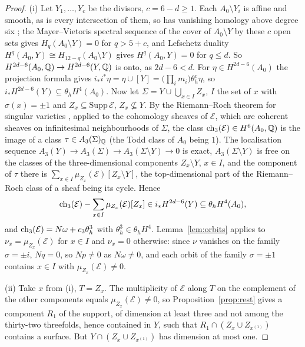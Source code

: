 \begin{proof}
(i) Let $Y_{1},\dots,Y_{c}$ be the divisors, $c=6-d\ge1$. Each $A_{0}\setminus Y_{i}$ is affine and smooth, as is every intersection of them, so has vanishing homology above degree six \cite{AF59}; the Mayer--Vietoris spectral sequence of the cover of $A_{0}\setminus Y$ by these $c$ open sets gives $H_{q}(A_{0}\setminus Y)=0$ for $q>5+c$, and Lefschetz duality $H^{q}(A_{0},Y)\cong H_{12-q}(A_{0}\setminus Y)$ gives $H^{q}(A_{0},Y)=0$ for $q\le d$. So $H^{2d-6}(A_{0},\mathbb{Q})\to H^{2d-6}(Y,\mathbb{Q})$ is onto, as $2d-6<d$. For $\eta\in H^{2d-6}(A_{0})$ the projection formula gives $i_{*}i^{*}\eta=\eta\cup[Y]=\bigl(\prod_{i}m_{i}\bigr)\theta_{h}^{c}\eta$, so $i_{*}H^{2d-6}(Y)\subseteq\theta_{h}H^{4}(A_{0})$. Now let $\Sigma=Y\cup\bigcup_{x\in I}Z_{x}$, $I$ the set of $x$ with $\sigma(x)=\pm1$ and $Z_{x}\subseteq\mathrm{Supp}\,\mathcal{E}$, $Z_{x}\not\subseteq Y$. By the Riemann--Roch theorem for singular varieties \cite[Ch.~18]{Ful98}, applied to the cohomology sheaves of $\mathcal{E}$, which are coherent sheaves on infinitesimal neighbourhoods of $\Sigma$, the class $\mathrm{ch}_{3}(\mathcal{E})\in H^{6}(A_{0},\mathbb{Q})$ is the image of a class $\tau\in A_{3}(\Sigma)_{\mathbb{Q}}$ (the Todd class of $A_{0}$ being $1$). The localisation sequence $A_{3}(Y)\to A_{3}(\Sigma)\to A_{3}(\Sigma\setminus Y)\to0$ is exact, $A_{3}(\Sigma\setminus Y)$ is free on the classes of the three-dimensional components $Z_{x}\setminus Y$, $x\in I$, and the component of $\tau$ there is $\sum_{x\in I}\mu_{Z_{x}}(\mathcal{E})[Z_{x}\setminus Y]$, the top-dimensional part of the Riemann--Roch class of a sheaf being its cycle. Hence
\[
\mathrm{ch}_{3}(\mathcal{E})-\sum_{x\in I}\mu_{Z_{x}}(\mathcal{E})[Z_{x}]\in i_{*}H^{2d-6}(Y)\subseteq\theta_{h}H^{4}(A_{0}),
\]
and $\mathrm{ch}_{3}(\mathcal{E})=N\omega+c_{3}\theta_{h}^{3}$ with $\theta_{h}^{3}\in\theta_{h}H^{4}$. Lemma~\ref{lem:orbits} applies to $\nu_{x}=\mu_{Z_{x}}(\mathcal{E})$ for $x\in I$ and $\nu_{x}=0$ otherwise: since $\nu$ vanishes on the family $\sigma=\pm i$, $Nq=0$, so $Np\ne0$ as $N\omega\ne0$, and each orbit of the family $\sigma=\pm1$ contains $x\in I$ with $\mu_{Z_{x}}(\mathcal{E})\ne0$.

(ii) Take $x$ from (i), $T=Z_{x}$. The multiplicity of $\mathcal{E}$ along $T$ on the complement of the other components equals $\mu_{Z_{x}}(\mathcal{E})\ne0$, so Proposition~\ref{prop:rest} gives a component $R_{1}$ of the support, of dimension at least three and not among the thirty-two threefolds, hence contained in $Y$, such that $R_{1}\cap(Z_{x}\cup Z_{x^{(1)}})$ contains a surface. But $Y\cap(Z_{x}\cup Z_{x^{(1)}})$ has dimension at most one.
\end{proof}

